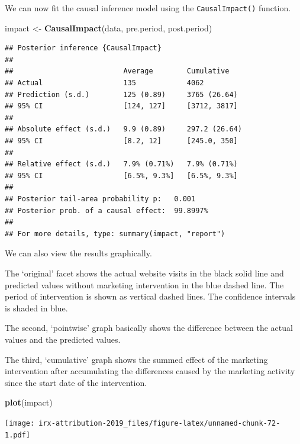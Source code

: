 \documentclass[]{book}
\newenvironment{Shaded}{\begin{snugshade}}{\end{snugshade}}
\newcommand{\KeywordTok}[1]{\textcolor[rgb]{0.13,0.29,0.53}{\textbf{#1}}}
\newcommand{\StringTok}[1]{\textcolor[rgb]{0.31,0.60,0.02}{#1}}
\newcommand{\NormalTok}[1]{#1}
\begin{document}
We can now fit the causal inference model using the
\texttt{CausalImpact()} function.

\begin{Shaded}
\begin{Highlighting}[]
\NormalTok{impact <-}\StringTok{ }\KeywordTok{CausalImpact}\NormalTok{(data, pre.period, post.period)}
\end{Highlighting}
\end{Shaded}

\begin{verbatim}
## Posterior inference {CausalImpact}
## 
##                          Average        Cumulative   
## Actual                   135            4062         
## Prediction (s.d.)        125 (0.89)     3765 (26.64) 
## 95% CI                   [124, 127]     [3712, 3817] 
##                                                      
## Absolute effect (s.d.)   9.9 (0.89)     297.2 (26.64)
## 95% CI                   [8.2, 12]      [245.0, 350] 
##                                                      
## Relative effect (s.d.)   7.9% (0.71%)   7.9% (0.71%) 
## 95% CI                   [6.5%, 9.3%]   [6.5%, 9.3%] 
## 
## Posterior tail-area probability p:   0.001
## Posterior prob. of a causal effect:  99.8997%
## 
## For more details, type: summary(impact, "report")
\end{verbatim}

We can also view the results graphically.

The `original' facet shows the actual website visits in the black solid
line and predicted values without marketing intervention in the blue
dashed line. The period of intervention is shown as vertical dashed
lines. The confidence intervals is shaded in blue.

The second, `pointwise' graph basically shows the difference between the
actual values and the predicted values.

The third, `cumulative' graph shows the summed effect of the marketing
intervention after accumulating the differences caused by the marketing
activity since the start date of the intervention.

\begin{Shaded}
\begin{Highlighting}[]
\KeywordTok{plot}\NormalTok{(impact)}
\end{Highlighting}
\end{Shaded}

\texttt{[image: irx-attribution-2019\_files/figure-latex/unnamed-chunk-72-1.pdf]}
\end{document}
